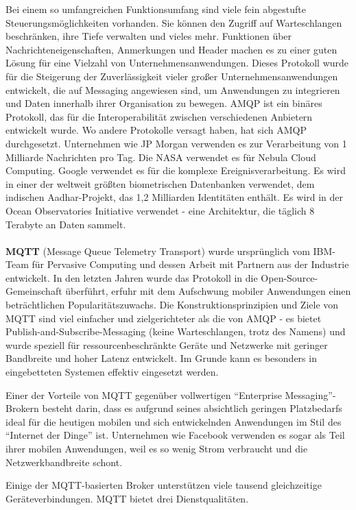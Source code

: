Bei einem so umfangreichen Funktionsumfang sind viele fein abgestufte Steuerungsmöglichkeiten vorhanden. Sie können den Zugriff auf Warteschlangen beschränken, ihre Tiefe verwalten und vieles mehr. Funktionen über Nachrichteneigenschaften, Anmerkungen und Header machen es zu einer guten Lösung für eine Vielzahl von Unternehmensanwendungen. Dieses Protokoll wurde für die Steigerung der Zuverlässigkeit vieler großer Unternehmensanwendungen entwickelt, die auf Messaging angewiesen sind, um Anwendungen zu integrieren und Daten innerhalb ihrer Organisation zu bewegen. AMQP ist ein binäres Protokoll, das für die Interoperabilität zwischen verschiedenen Anbietern entwickelt wurde. Wo andere Protokolle versagt haben, hat sich AMQP durchgesetzt. Unternehmen wie JP Morgan verwenden es zur Verarbeitung von 1 Milliarde Nachrichten pro Tag. Die NASA verwendet es für Nebula Cloud Computing. Google verwendet es für die komplexe Ereignisverarbeitung. Es wird in einer der weltweit größten biometrischen Datenbanken verwendet, dem indischen Aadhar-Projekt, das 1,2 Milliarden Identitäten enthält. Es wird in der Ocean Observatories Initiative verwendet - eine Architektur, die täglich 8 Terabyte an Daten sammelt. 
\\\\
\textbf{MQTT} (Message Queue Telemetry Transport) wurde ursprünglich vom IBM-Team für Pervasive Computing und dessen Arbeit mit Partnern aus der Industrie entwickelt. In den letzten Jahren wurde das Protokoll in die Open-Source-Gemeinschaft überführt, erfuhr mit dem Aufschwung mobiler Anwendungen einen beträchtlichen Popularitätszuwachs. Die Konstruktionsprinzipien und Ziele von MQTT sind viel einfacher und zielgerichteter als die von AMQP - es bietet Publish-and-Subscribe-Messaging (keine Warteschlangen, trotz des Namens) und wurde speziell für ressourcenbeschränkte Geräte und Netzwerke mit geringer Bandbreite und hoher Latenz entwickelt. Im Grunde kann es besonders in eingebetteten Systemen effektiv eingesetzt werden.

Einer der Vorteile von MQTT gegenüber vollwertigen \enquote{Enterprise Messaging}-Brokern besteht darin, dass es aufgrund seines absichtlich geringen Platzbedarfs ideal für die heutigen mobilen und sich entwickelnden Anwendungen im Stil des \enquote{Internet der Dinge} ist. Unternehmen wie Facebook verwenden es sogar als Teil ihrer mobilen Anwendungen, weil es so wenig Strom verbraucht und die Netzwerkbandbreite schont.

Einige der MQTT-basierten Broker unterstützen viele tausend gleichzeitige Geräteverbindungen. MQTT bietet drei Dienstqualitäten.

